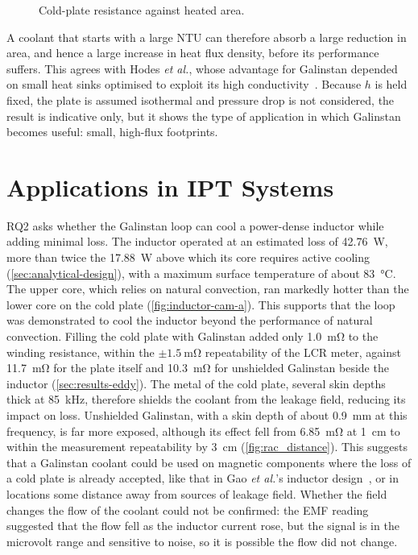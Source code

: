 \begin{figure}[htbp]
  \centering
  
  \caption{Cold-plate resistance against heated area.}
  \label{fig:area-scaling}
\end{figure}

A coolant that starts with a large NTU can therefore absorb a large reduction in
area, and hence a large increase in heat flux density, before its performance suffers.
This agrees with Hodes \emph{et al.}, whose advantage for Galinstan depended on
small heat sinks optimised to exploit its high
conductivity~\cite{hodes_potential_2014}. Because $h$ is held fixed, the plate is
assumed isothermal and pressure drop is not considered, the result is indicative
only, but it shows the type of application in which Galinstan becomes useful:
small, high-flux footprints.

\section{Applications in IPT Systems}
\label{sec:disc-suitability}

RQ2 asks whether the Galinstan loop can cool a power-dense inductor while adding
minimal loss. The inductor operated at an estimated loss of \SI{42.76}{\watt},
more than twice the \SI{17.88}{\watt} above which its core requires active
cooling (\cref{sec:analytical-design}), with a maximum surface temperature of
about \SI{83}{\celsius}. The upper core, which relies on natural convection, ran
markedly hotter than the lower core on the cold plate
(\cref{fig:inductor-cam-a}). This supports that the loop
was demonstrated to cool the inductor beyond the performance of natural convection. Filling the cold plate with
Galinstan added only \SI{1.0}{\milli\ohm} to the winding resistance, within the
$\pm\SI{1.5}{\milli\ohm}$ repeatability of the LCR meter, against
\SI{11.7}{\milli\ohm} for the plate itself and \SI{10.3}{\milli\ohm} for
unshielded Galinstan beside the inductor (\cref{sec:results-eddy}). The metal of
the cold plate, several skin depths thick at \SI{85}{\kilo\hertz}, therefore
shields the coolant from the leakage field, reducing its impact on loss. Unshielded Galinstan, with a skin depth of about \SI{0.9}{\milli\metre} at
this frequency, is far more exposed, although its effect fell from
\SI{6.85}{\milli\ohm} at \SI{1}{\centi\metre} to within the measurement
repeatability by \SI{3}{\centi\metre} (\cref{fig:rac_distance}). This suggests that a Galinstan
coolant could be used on magnetic components where the loss of a cold plate is already accepted, like that
in Gao \emph{et al.}'s inductor design~\cite{gao_modeling_2022}, or in locations some distance away from sources of leakage field.
Whether the field changes the flow of the coolant could not be confirmed: the EMF reading
suggested that the flow fell as the inductor current rose, but the signal is in
the microvolt range and sensitive to noise, so it is possible the flow did not change.

